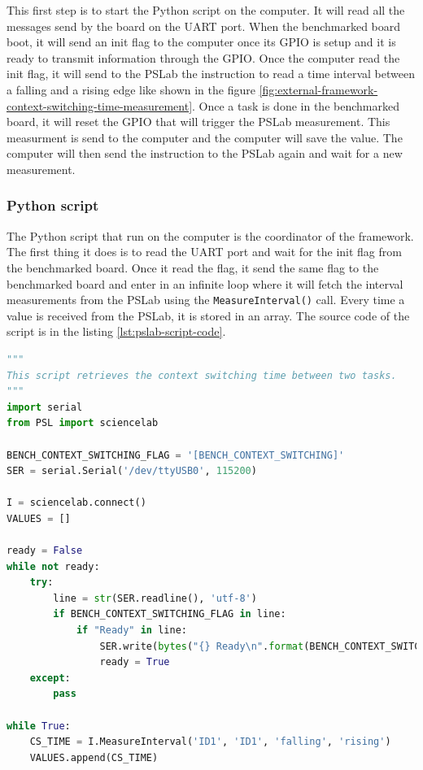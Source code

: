 This first step is to start the Python script on the computer. It will read all the messages send by the board on the UART port.
When the benchmarked board boot, it will send an init flag to the computer once its GPIO is setup and it is ready to transmit information through the GPIO.
Once the computer read the init flag, it will send to the PSLab the instruction to read a time interval between a falling and a rising edge like shown in the figure \ref{fig:external-framework-context-switching-time-measurement}.
Once a task is done in the benchmarked board, it will reset the GPIO that will trigger the PSLab measurement.
This measurment is send to the computer and the computer will save the value.
The computer will then send the instruction to the PSLab again and wait for a new measurement.

\subsubsection{Python script}

The Python script that run on the computer is the coordinator of the framework.
The first thing it does is to read the UART port and wait for the init flag from the benchmarked board.
Once it read the flag, it send the same flag to the benchmarked board and enter in an infinite loop where it will fetch the interval measurements from the PSLab using the \texttt{MeasureInterval()} call.
Every time a value is received from the PSLab, it is stored in an array.
The source code of the script is in the listing \ref{lst:pslab-script-code}.

\begin{lstlisting}[style=CStyle, float, language=python, label={lst:pslab-script-code}, caption={Python script source code}]
"""
This script retrieves the context switching time between two tasks.
"""
import serial
from PSL import sciencelab

BENCH_CONTEXT_SWITCHING_FLAG = '[BENCH_CONTEXT_SWITCHING]' 
SER = serial.Serial('/dev/ttyUSB0', 115200)

I = sciencelab.connect()
VALUES = []

ready = False
while not ready:
    try:
        line = str(SER.readline(), 'utf-8')
        if BENCH_CONTEXT_SWITCHING_FLAG in line:
            if "Ready" in line:
                SER.write(bytes("{} Ready\n".format(BENCH_CONTEXT_SWITCHING_FLAG), 'utf-8'))
                ready = True
    except:
        pass

while True:
    CS_TIME = I.MeasureInterval('ID1', 'ID1', 'falling', 'rising')
    VALUES.append(CS_TIME)
\end{lstlisting}

